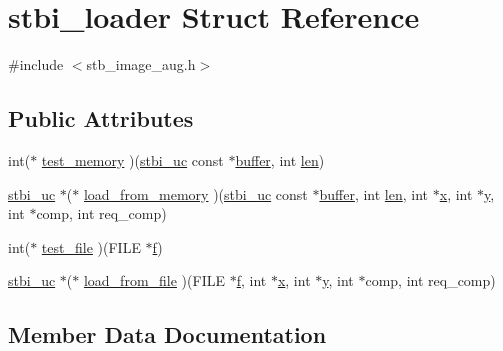 \hypertarget{structstbi__loader}{}\section{stbi\+\_\+loader Struct Reference}
\label{structstbi__loader}


{\ttfamily \#include $<$stb\+\_\+image\+\_\+aug.\+h$>$}

\subsection*{Public Attributes}
\begin{DoxyCompactItemize}
\item 
int($\ast$ \hyperlink{structstbi__loader_ad2df36e7390f0a75bdd46f90afae9267}{test\+\_\+memory} )(\hyperlink{stb__image__aug_8h_a28eb51a1512ce382ee50f20e1d04d50d}{stbi\+\_\+uc} const $\ast$\hyperlink{glcorearb_8h_a76461e97a098d2c9ae20ac193d3825ae}{buffer}, int \hyperlink{glext_8h_a652168017ea9a8bbcead03d5c16269fb}{len})
\item 
\hyperlink{stb__image__aug_8h_a28eb51a1512ce382ee50f20e1d04d50d}{stbi\+\_\+uc} $\ast$($\ast$ \hyperlink{structstbi__loader_a19c3a299a2acffd3a6a9cde60557fb59}{load\+\_\+from\+\_\+memory} )(\hyperlink{stb__image__aug_8h_a28eb51a1512ce382ee50f20e1d04d50d}{stbi\+\_\+uc} const $\ast$\hyperlink{glcorearb_8h_a76461e97a098d2c9ae20ac193d3825ae}{buffer}, int \hyperlink{glext_8h_a652168017ea9a8bbcead03d5c16269fb}{len}, int $\ast$\hyperlink{gl_8h_ad0e63d0edcdbd3d79554076bf309fd47}{x}, int $\ast$\hyperlink{gl_8h_a1675d9d7bb68e1657ff028643b4037e3}{y}, int $\ast$comp, int req\+\_\+comp)
\item 
int($\ast$ \hyperlink{structstbi__loader_a29f8108b16faac0a11f5120b45a39153}{test\+\_\+file} )(F\+I\+LE $\ast$\hyperlink{glcorearb_8h_a691492ec0bd6383f91200e49f6ae40ed}{f})
\item 
\hyperlink{stb__image__aug_8h_a28eb51a1512ce382ee50f20e1d04d50d}{stbi\+\_\+uc} $\ast$($\ast$ \hyperlink{structstbi__loader_a9b1dcde3f8f09e9d2026e5cca5089c5f}{load\+\_\+from\+\_\+file} )(F\+I\+LE $\ast$\hyperlink{glcorearb_8h_a691492ec0bd6383f91200e49f6ae40ed}{f}, int $\ast$\hyperlink{gl_8h_ad0e63d0edcdbd3d79554076bf309fd47}{x}, int $\ast$\hyperlink{gl_8h_a1675d9d7bb68e1657ff028643b4037e3}{y}, int $\ast$comp, int req\+\_\+comp)
\end{DoxyCompactItemize}


\subsection{Member Data Documentation}
\mbox{\label{structstbi__loader_a9b1dcde3f8f09e9d2026e5cca5089c5f}} 
